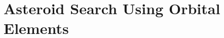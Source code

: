 \documentclass[11pt]{gsasthesis} %
\begin{document}
% 

% 

% 

\chapter{Asteroid Search Using Orbital Elements}\label{ch:4}


% 



\begin{singlespacing}
\renewcommand{\bibname}{References}

% 
% 

\end{singlespacing}

% 
\end{document}
